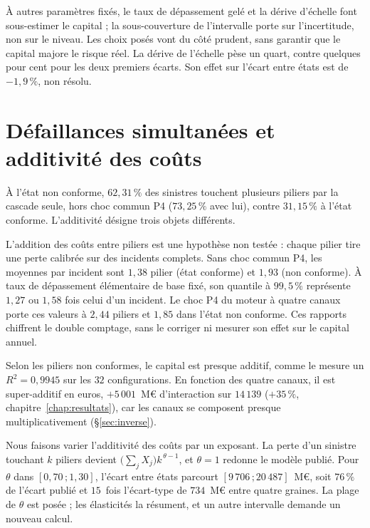 \vspace{4pt}
\noindent À autres paramètres fixés, le taux de dépassement gelé et la dérive d'échelle font sous-estimer le capital ; la sous-couverture de l'intervalle porte sur l'incertitude, non sur le niveau. Les choix posés vont du côté prudent, sans garantir que le capital majore le risque réel. La dérive de l'échelle
pèse un quart, contre quelques pour cent pour les deux premiers écarts. Son effet sur l'écart
entre états est de $-1{,}9\,\%$, non résolu.


\section{Défaillances simultanées et additivité des coûts}
\label{sec:additivite-couts}

À l'état non conforme, $62{,}31\,\%$ des sinistres touchent plusieurs piliers
par la cascade seule, hors choc commun P4 ($73{,}25\,\%$ avec lui), contre $31{,}15\,\%$ à l'état conforme.
L'additivité désigne trois objets différents.

L'addition des coûts entre piliers est une hypothèse non testée : chaque pilier tire une perte calibrée sur des incidents complets.
Sans choc commun P4, les moyennes par incident sont $1{,}38$ pilier (état conforme) et $1{,}93$ (non conforme).
À taux de dépassement élémentaire de base fixé, son quantile à $99{,}5\,\%$ représente $1{,}27$ ou $1{,}58$ fois celui d'un incident.
Le choc P4 du moteur à quatre canaux porte ces valeurs à $2{,}44$ piliers et $1{,}85$ dans l'état non conforme.
Ces rapports chiffrent le double comptage, sans le corriger ni mesurer son effet sur le capital annuel.

Selon les piliers non conformes, le capital est presque
additif, comme le mesure un $R^2=0{,}9945$ sur les $32$ configurations. En fonction des quatre canaux,
il est super-additif en euros, $+5\,001$~M\euro{} d'interaction sur $14\,139$ ($+35\,\%$,
chapitre~\ref{chap:resultats}), car les canaux se composent presque multiplicativement
(\S\ref{sec:inverse}).

Nous faisons varier l'additivité des coûts par un exposant. La perte d'un sinistre touchant $k$ piliers
devient $\bigl(\sum_j X_j\bigr)k^{\,\theta-1}$, et $\theta=1$ redonne le modèle publié. Pour $\theta$ dans $[0{,}70\,;1{,}30]$, l'écart entre états parcourt
$[9\,706\,;20\,487]$~M\euro, soit $76\,\%$ de l'écart publié et $15$~fois l'écart-type de $734$~M\euro{}
entre quatre graines. La plage de $\theta$ est posée ; les élasticités la résument, et un autre intervalle demande un nouveau calcul.

